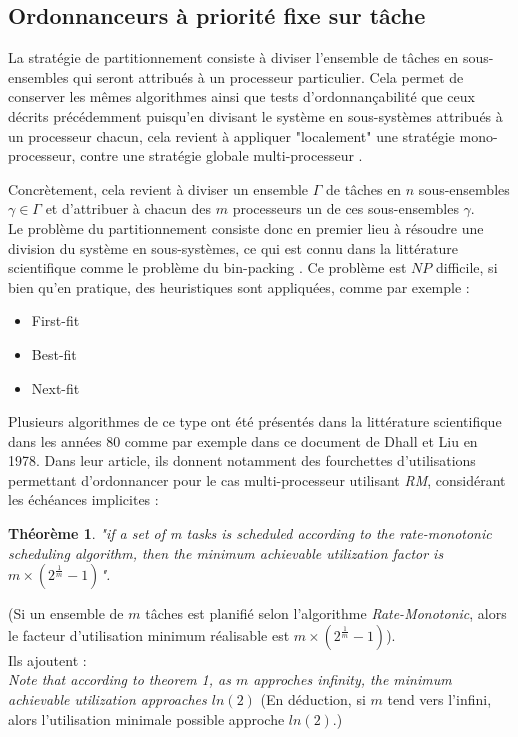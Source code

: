 \documentclass[11pt,a4paper,oneside]{report}
\newtheorem{mytheorem}{Théorème}
\begin{document}
\subsection{Ordonnanceurs à priorité fixe sur tâche}

La stratégie de partitionnement consiste à diviser l'ensemble de tâches en sous-ensembles qui seront 
attribués à un processeur particulier. Cela permet de conserver les mêmes algorithmes ainsi 
que tests d'ordonnançabilité que ceux 
décrits précédemment puisqu'en divisant le système en sous-systèmes attribués à un 
processeur chacun, cela revient à appliquer "localement" une stratégie mono-processeur, contre 
une stratégie globale multi-processeur \cite{ndoye_ordonnancement_2014}.

Concrètement, cela revient à diviser un ensemble $\Gamma$ de tâches en $n$ sous-ensembles 
$\gamma \in \Gamma$ et d'attribuer à chacun des $m$ processeurs un de ces sous-ensembles $\gamma$.\\


Le problème du partitionnement consiste donc en premier lieu 
à résoudre une division du système en sous-systèmes, ce qui est connu dans la 
littérature scientifique comme le problème du bin-packing \cite{ausiello_approximation_1984}.
Ce problème est $NP$ difficile, si bien qu'en pratique, 
des heuristiques sont appliquées, comme par exemple :\\
\begin{itemize}
	\item First-fit 
	\item Best-fit
	\item Next-fit
\end{itemize}

Plusieurs algorithmes de ce type ont été présentés dans la littérature scientifique
dans les années 80 comme par exemple \cite{dhall_real-time_1978} dans ce 
document de Dhall et Liu en 1978. 
Dans leur article, ils donnent notamment des fourchettes d'utilisations 
permettant d'ordonnancer pour le cas multi-processeur utilisant \textit{RM}, 
considérant les échéances implicites :
\begin{mytheorem}
\textit{"if a set of m tasks is scheduled according to the rate-monotonic scheduling algorithm, then the minimum achievable utilization factor is $m\times(2^{\frac{1}{m}} - 1)$".}
\end{mytheorem}
(Si un ensemble de $m$ tâches est planifié selon l'algorithme \textit{Rate-Monotonic}, 
alors le facteur d'utilisation minimum réalisable est $m\times(2^{\frac{1}{m}} - 1)$). \\
Ils ajoutent :\\
\textit{Note that according to theorem 1, as $m$ approches infinity, 
	the minimum achievable utilization approaches $ln(2)$}
(En déduction, si $m$ tend vers l'infini, alors l'utilisation minimale possible approche $ln(2)$.) \\
\end{document}
